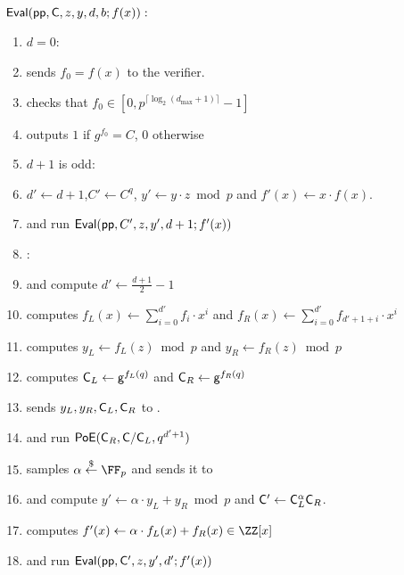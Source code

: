 \documentclass{article}
\theoremstyle{definition}
\begin{document}
\begin{mdframed}
\begin{minipage}{\textwidth}
			$\textsf{{Eval}}(\textsf{pp}, \mathsf{C}, z, y, d,b; f(x)) :$ 
	    \begin{enumerate}[nolistsep]
        \item \pcif $d=0$:
        \item \pcind[1] \prover sends $f_0=f(x)$ to the verifier. 
        \item \pcind[1] \verifier checks that $f_0 \in [0,p^{\lceil\log_2(d_{\max}+1)\rceil}-1]$
        \item \pcind[1] \verifier outputs $1$ if $g^{f_0}=C$, $0$ otherwise
                 \item  \pcif $d+1$ is odd: 
         \item \pcind[1]  $d'\gets d+1$,$ C'\gets C^q$, $y'\gets y\cdot z \bmod p$ and $f'(x)\gets x \cdot f(x)$.
         \item \pcind[1] \prover and \verifier run $\textsf{{Eval}}(\textsf{pp},C',z,y',d+1;f'(x))$
        \item \pcelse: 
       
        \item \pcind[1] \prover and \verifier compute $d' \gets \frac{d+1}{2} - 1$
        \item \pcind[1] \prover computes $f_L(x) \gets \sum\limits_{i=0}^{d'} f_i \cdot x^i$ and $f_R(x)\gets\sum\limits_{i=0}^{d'} f_{d'+1+i}\cdot x^{i}$
        \item \pcind[1] \prover computes $y_L\gets f_L(z) \bmod p$ and $y_R\gets f_R(z)\bmod p$
        \item \pcind[1] \prover computes $\mathsf{C}_L \gets \mathsf{g}^{f_L(q)}$ and $\mathsf{C}_R \gets \mathsf{g}^{f_R(q)}$
        \item \pcind[1] \prover sends $y_L,y_R, \mathsf{C}_L, \mathsf{C}_R$ to \verifier. 
        \item \pcind[1] \prover and \verifier run $\textsf{{PoE}}(\mathsf{C}_R, \mathsf{C}/\mathsf{C}_L, q^{d'+1})$
        \item \pcind[1] \verifier samples $\alpha \sample \FF_p$ and sends it to \prover
        \item \pcind[1] \prover and \verifier compute $y'\gets\alpha \cdot y_L +y_R \bmod p$ and $\mathsf{C}' \gets \mathsf{C}_L^\alpha  \mathsf{C}_R$. 
        \item \pcind[1] \prover computes $f'(x) \gets \alpha \cdot f_L(x) + f_R(x) \in \ZZ[x]$ 
        \item \pcind[1] \prover and \verifier run $\textsf{{Eval}}(\textsf{pp}, \mathsf{C}', z, y', d'; f'(x))$
               \end{enumerate}
      \end{minipage}
\end{mdframed}
\end{document}

